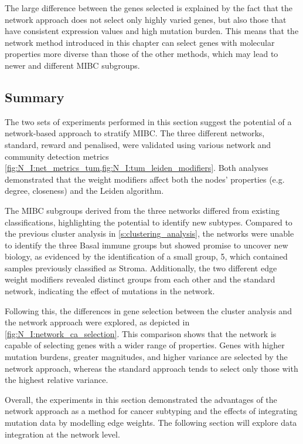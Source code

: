 The large difference between the genes selected is explained by the fact that the network approach does not select only highly varied genes, but also those that have consistent expression values and high mutation burden. This means that the network method introduced in this chapter can select genes with molecular properties more diverse than those of the other methods, which may lead to newer and different MIBC subgroups.


\subsection{Summary}

The two sets of experiments performed in this section suggest the potential of a network-based approach to stratify MIBC. The three different networks, standard, reward and penalised, were validated using various network and community detection metrics \cref{fig:N_I:net_metrics_tum,fig:N_I:tum_leiden_modifiers}. Both analyses demonstrated that the weight modifiers affect both the nodes' properties (e.g. degree, closeness) and the Leiden algorithm.

The MIBC subgroups derived from the three networks differed from existing classifications, highlighting the potential to identify new subtypes. Compared to the previous cluster analysis in \cref{s:clustering_analysis}, the networks were unable to identify the three Basal immune groups but showed promise to uncover new biology, as evidenced by the identification of a small group, 5, which contained samples previously classified as Stroma. Additionally, the two different edge weight modifiers revealed distinct groups from each other and the standard network, indicating the effect of mutations in the network.

Following this, the differences in gene selection between the cluster analysis and the network approach were explored, as depicted in \cref{fig:N_I:network_ca_selection}. This comparison shows that the network is capable of selecting genes with a wider range of properties. Genes with higher mutation burdens, greater magnitudes, and higher variance are selected by the network approach, whereas the standard approach tends to select only those with the highest relative variance.

Overall, the experiments in this section demonstrated the advantages of the network approach as a method for cancer subtyping and the effects of integrating mutation data by modelling edge weights. The following section will explore data integration at the network level.
